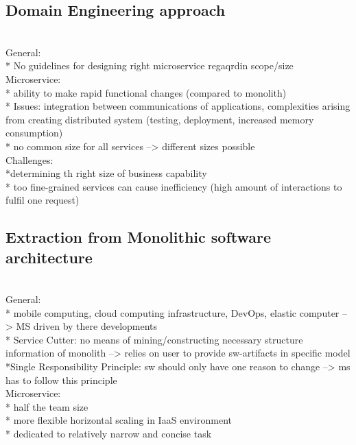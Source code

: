 \subsection{Domain Engineering approach}
\cite{DomainEngineeringMunezero} \\

General:\\
* No guidelines for designing right microservice regaqrdin scope/size \\

Microservice:\\
* ability to make rapid functional changes (compared to monolith)\\
* Issues: integration between communications of applications, complexities arising from creating distributed system (testing, deployment, increased memory consumption)\\
* no common size for all services --> different sizes possible\\


Challenges: \\
*determining th right size of business capability \\
* too fine-grained services can cause inefficiency (high amount of interactions to fulfil one request)\\

\subsection{Extraction from Monolithic software architecture}
\cite{ExtractionMazlami} \\


General:\\
* mobile computing, cloud computing infrastructure, DevOps, elastic computer --> MS driven by there developments\\
* Service Cutter: no means of mining/constructing necessary structure information of monolith --> relies on user to provide sw-artifacts in specific model\\
*Single Responsibility Principle: sw should only have one reason to change --> ms has to follow this principle\\

Microservice:\\
* half the team size\\
* more flexible horizontal scaling in IaaS environment\\
* dedicated to relatively narrow and concise task\\


